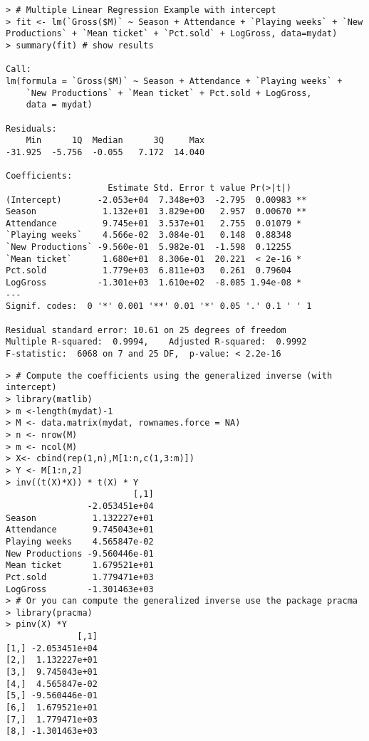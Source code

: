 \begin{frame}[fragile]
\begin{lstlisting}
> # Multiple Linear Regression Example with intercept
> fit <- lm(`Gross($M)` ~ Season + Attendance + `Playing weeks` + `New Productions` + `Mean ticket` + `Pct.sold` + LogGross, data=mydat)
> summary(fit) # show results

Call:
lm(formula = `Gross($M)` ~ Season + Attendance + `Playing weeks` +
    `New Productions` + `Mean ticket` + Pct.sold + LogGross,
    data = mydat)

Residuals:
    Min      1Q  Median      3Q     Max
-31.925  -5.756  -0.055   7.172  14.040

Coefficients:
                    Estimate Std. Error t value Pr(>|t|)
(Intercept)       -2.053e+04  7.348e+03  -2.795  0.00983 **
Season             1.132e+01  3.829e+00   2.957  0.00670 **
Attendance         9.745e+01  3.537e+01   2.755  0.01079 *
`Playing weeks`    4.566e-02  3.084e-01   0.148  0.88348
`New Productions` -9.560e-01  5.982e-01  -1.598  0.12255
`Mean ticket`      1.680e+01  8.306e-01  20.221  < 2e-16 *
Pct.sold           1.779e+03  6.811e+03   0.261  0.79604
LogGross          -1.301e+03  1.610e+02  -8.085 1.94e-08 *
---
Signif. codes:  0 '*' 0.001 '**' 0.01 '*' 0.05 '.' 0.1 ' ' 1

Residual standard error: 10.61 on 25 degrees of freedom
Multiple R-squared:  0.9994,	Adjusted R-squared:  0.9992
F-statistic:  6068 on 7 and 25 DF,  p-value: < 2.2e-16
\end{lstlisting}
\end{frame}
\begin{frame}[fragile]
\begin{lstlisting}
> # Compute the coefficients using the generalized inverse (with intercept)
> library(matlib)
> m <-length(mydat)-1
> M <- data.matrix(mydat, rownames.force = NA)
> n <- nrow(M)
> m <- ncol(M)
> X<- cbind(rep(1,n),M[1:n,c(1,3:m)])
> Y <- M[1:n,2]
> inv((t(X)*X)) * t(X) * Y
                         [,1]
                -2.053451e+04
Season           1.132227e+01
Attendance       9.745043e+01
Playing weeks    4.565847e-02
New Productions -9.560446e-01
Mean ticket      1.679521e+01
Pct.sold         1.779471e+03
LogGross        -1.301463e+03
> # Or you can compute the generalized inverse use the package pracma
> library(pracma)
> pinv(X) *Y
              [,1]
[1,] -2.053451e+04
[2,]  1.132227e+01
[3,]  9.745043e+01
[4,]  4.565847e-02
[5,] -9.560446e-01
[6,]  1.679521e+01
[7,]  1.779471e+03
[8,] -1.301463e+03
\end{lstlisting}
\end{frame}

